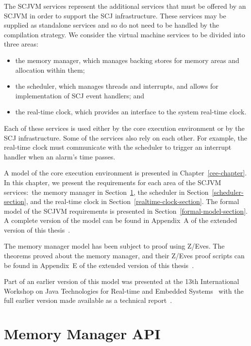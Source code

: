 The SCJVM services represent the additional services that must be
offered by an SCJVM in order to support the SCJ infrastructure.
These services may be supplied as standalone services and so do not
need to be handled by the compilation strategy.
We consider the virtual machine services to be divided into three
areas:
\begin{itemize}
\item the memory manager, which manages backing stores for memory areas and
  allocation within them;
\item the scheduler, which manages threads and interrupts, and allows for
  implementation of SCJ event handlers; and
\item the real-time clock, which provides an interface to the system real-time
  clock.
\end{itemize}
Each of these services is used either by the core execution
environment or by the SCJ infrastructure.
Some of the services also rely on each other. 
For example, the real-time clock must communicate with the scheduler
to trigger an interrupt handler when an alarm's time passes.

A model of the core execution environment is presented in
Chapter~\ref{cee-chapter}.
In this chapter, we present the requirements for each area of the
SCJVM services:~the memory manager in
Section~\ref{memory-manager-section}, the scheduler in
Section~\ref{scheduler-section}, and the real-time clock in
Section~\ref{realtime-clock-section}.
The formal model of the SCJVM requirements is presented in
Section~\ref{formal-model-section}.
A complete version of the model can be found in
Appendix~A of the extended version of this thesis~\cite{baxter2018-extended}.

The memory manager model has been subject to proof using Z/Eves.
The theorems proved about the memory manager, and their Z/Eves proof
scripts can be found in Appendix~E of the extended version of this
thesis~\cite{baxter2018-extended}.

Part of an earlier version of this model was presented at the 13th
International Workshop on Java Technologies for Real-time and Embedded
Systems~\cite{baxter2015a} with the full earlier version made available
as a technical report~\cite{baxter2015}.

\section{Memory Manager API}
\label{memory-manager-section}

